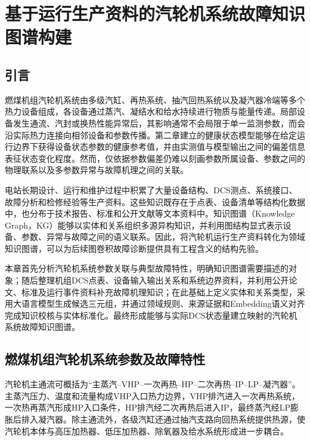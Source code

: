 \section{基于运行生产资料的汽轮机系统故障知识图谱构建}
\label{sec:knowledge_graph_v7}

\subsection{引言}

燃煤机组汽轮机系统由多级汽缸、再热系统、抽汽回热系统以及凝汽器冷端等多个热力设备组成，各设备通过蒸汽、凝结水和给水持续进行物质与能量传递。局部设备发生通流、汽封或换热性能异常后，其影响通常不会局限于单一监测参数，而会沿实际热力连接向相邻设备和参数传播。第二章建立的健康状态模型能够在给定运行边界下获得设备状态参数的健康参考值，并由实测值与模型输出之间的偏差信息表征状态变化程度。然而，仅依据参数偏差仍难以刻画参数所属设备、参数之间的物理联系以及多参数异常与故障机理之间的关联。

电站长期设计、运行和维护过程中积累了大量设备结构、DCS测点、系统接口、故障分析和检修经验等生产资料。这些知识既存在于点表、设备清单等结构化数据中，也分布于技术报告、标准和公开文献等文本资料中。知识图谱（Knowledge Graph，KG）能够以实体和关系组织多源异构知识，并利用图结构显式表示设备、参数、异常与故障之间的语义联系\cite{Hogan2021KnowledgeGraphs}。因此，将汽轮机运行生产资料转化为领域知识图谱，可以为后续图卷积故障诊断提供具有工程含义的结构先验。

本章首先分析汽轮机系统参数关联与典型故障特性，明确知识图谱需要描述的对象；随后整理机组DCS点表、设备输入输出关系和系统边界资料，并利用公开论文、标准及运行事件资料补充故障机理知识；在此基础上定义实体和关系类型，采用大语言模型生成候选三元组，并通过领域规则、来源证据和Embedding语义对齐完成知识校核与实体标准化。最终形成能够与实际DCS状态量建立映射的汽轮机系统故障知识图谱。

\subsection{燃煤机组汽轮机系统参数及故障特性}
\label{subsec:turbine_fault_characteristics_v7}

汽轮机主通流可概括为“主蒸汽--VHP--一次再热--HP--二次再热--IP--LP--凝汽器”。主蒸汽压力、温度和流量构成VHP入口热力边界，VHP排汽进入一次再热系统，一次热再蒸汽形成HP入口条件，HP排汽经二次再热后进入IP，最终蒸汽经LP膨胀后排入凝汽器。除主通流外，各级汽缸还通过抽汽支路向回热系统提供热源，使汽轮机本体与高压加热器、低压加热器、除氧器及给水系统形成进一步耦合。

